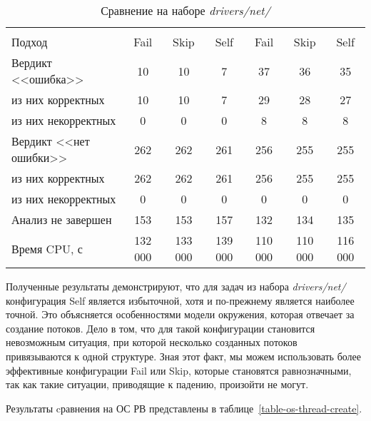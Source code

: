   \begin{table}[h]\footnotesize \centering
    \caption{Сравнение на наборе \textit{drivers/net/}}
  	\label{table-drivers-thread-create}
    \begin{tabular}{ | l | c | c | c | c | c | c |}
      \hline
      				& 		\multicolumn{3}{c|}{\theoryraces} 		& \multicolumn{3}{c|}{\combatmode} \\
      Подход         				& Fail 		& Skip 		& Self 		& Fail 	& Skip 		& Self  \\ \hline
      Вердикт <<ошибка>> 			& 10   		& 10   		& 7   		& 37   	& 36   		& 35   \\ 
  \hspace{0.5cm} из них корректных 	& 10 		& 10 		& 7   		& 29   	& 28   		& 27   \\ 
  \hspace{0.5cm} из них некорректных & 0 		& 0 		& 0   		& 8   	& 8   		& 8   \\ \hline
      Вердикт <<нет ошибки>>  		& 262    	& 262    	& 261   	& 256   & 255  		& 255   \\ 
  \hspace{0.5cm} из них корректных 	& 262 		& 262    	& 261   	& 256   & 255   	& 255   \\
  \hspace{0.5cm} из них некорректных & 0 		& 0    		& 0     	& 0   	& 0   		& 0   \\ \hline
      Анализ не завершен       		& 153    	& 153    	& 157    	& 132   & 134   	& 135   \\ \hline
      Время CPU, с   				& 132 000 	& 133 000 	& 139 000 	& 110 000 & 110 000 & 116 000   \\ 
      \hline
    \end{tabular}
  \end{table}

Полученные результаты демонстрируют, что для задач из набора \textit{drivers/net/} конфигурация Self является избыточной, хотя и по-прежнему является наиболее точной.
Это объясняется особенностями модели окружения, которая отвечает за создание потоков. 
Дело в том, что для такой конфигурации становится невозможным ситуация, при которой несколько созданных потоков привязываются к одной структуре.
Зная этот факт, мы можем использовать более эффективные конфигурации Fail или Skip, которые становятся равнозначными, так как такие ситуации, приводящие к падению, произойти не могут.

Результаты cравнения на ОС РВ представлены в таблице~\ref{table-os-thread-create}.

